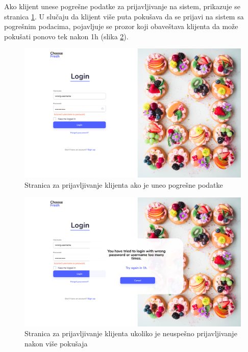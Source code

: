 Ako klijent unese pogrešne podatke za prijavljivanje na sistem, prikazuje se stranica \ref{fig:WrongInput}. U slučaju da klijent više puta pokušava da se prijavi na sistem sa pogrešnim podacima, pojavljuje se prozor koji obaveštava klijenta da može pokušati ponovo tek nakon 1h (slika \ref{fig:BruteForceAttack}).
\begin{figure}[H]
	\begin{center}
		\includegraphics[width=\textwidth]{UI/WrongInput.jpg}
    		\caption{Stranica za prijavljivanje klijenta ako je uneo pogrešne podatke}
    \label{fig:WrongInput}
    \end{center}
\end{figure}

\begin{figure}[H]
	\begin{center}
		\includegraphics[width=\textwidth]{UI/BruteForceAttack.jpg}
    		\caption{Stranica za prijavljivanje klijenta ukoliko je neuspešno prijavljivanje nakon više pokušaja}
    \label{fig:BruteForceAttack}
    \end{center}
\end{figure}
